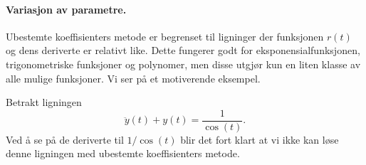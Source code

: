 \documentclass{article}
\theoremstyle{definition}
\newenvironment{ex}
{\pushQED{\qed}\renewcommand{\qedsymbol}{$\triangle$}\exx}
{\popQED\endexx}
\theoremstyle{remark}
\begin{document}
\begin{multicols*}{2}
\paragraph*{Variasjon av parametre.} Ubestemte koeffisienters metode er begrenset til ligninger der funksjonen $r(t)$ og dens deriverte er relativt like. Dette fungerer godt for eksponensialfunksjonen, trigonometriske funksjoner og polynomer, men disse utgjør kun en liten klasse av alle mulige funksjoner. Vi ser på et motiverende eksempel.

\begin{ex} \label{ex:motiverende_eks}
  Betrakt ligningen
  \begin{equation*}
    \ddot{y}(t) + y(t) = \frac{1}{\cos(t)}.
  \end{equation*}
  Ved å se på de deriverte til $1 / \cos(t)$ blir det fort klart at vi ikke kan løse denne ligningen med ubestemte koeffisienters metode.
\end{ex}


\end{multicols*}
\end{document}
